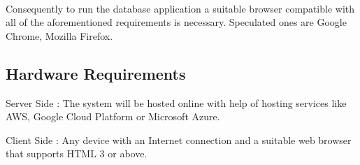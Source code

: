 \documentclass[12pt]{report}
\begin{document}
\paragraph{}
Consequently to run the database application a suitable browser compatible with all of the aforementioned requirements is necessary. Speculated ones are Google Chrome, Mozilla Firefox.




\subsection{Hardware Requirements}
Server Side : The system will be hosted online with help of hosting services like AWS, Google Cloud Platform or Microsoft Azure. 

Client Side :  Any device with an Internet connection and a suitable web browser that supports HTML 3 or above. 
\end{document}
